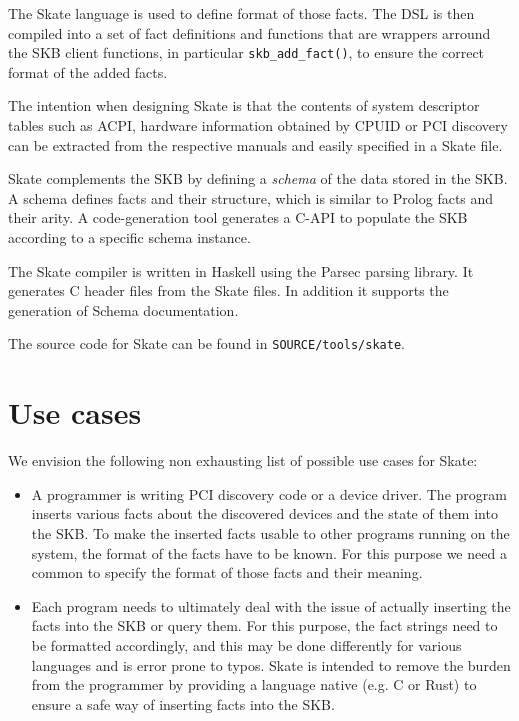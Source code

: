 \documentclass[a4paper,11pt,twoside]{report}
\begin{document}
{{The Skate language is used to define format of those facts. The DSL is then 
compiled into a set of fact definitions and functions that are wrappers arround
the SKB client functions, in particular \texttt{skb\_add\_fact()}, to ensure
the correct format of the added facts.  

The intention when designing Skate is that the contents of system descriptor
tables such as ACPI, hardware information obtained by CPUID or PCI discovery
can be extracted from the respective manuals and easily specified in a Skate 
file. 

Skate complements the SKB by defining a \emph{schema} of the data stored in
the SKB. A schema defines facts and their structure, which is similar to Prolog
facts and their arity. A code-generation tool generates a C-API to populate the
SKB according to a specific schema instance.

The Skate compiler is written in Haskell using the Parsec parsing library. It
generates C header files from the Skate files. In addition it supports the 
generation of Schema documentation.

The source code for Skate can be found in \texttt{SOURCE/tools/skate}.


\section{Use cases}

We envision the following non exhausting list of possible use cases for Skate:

\begin{itemize}
    \item A programmer is writing PCI discovery code or a device driver. The
    program inserts various facts about the discovered devices and the state
    of them into the SKB. To make the inserted facts usable to other programs
    running on the system, the format of the facts have to be known. For this 
    purpose we need a common to specify the format of those facts and their 
    meaning.
    
    \item Each program needs to ultimately deal with the issue of actually 
    inserting the facts into the SKB or query them. For this purpose, the fact 
    strings need to be formatted accordingly, and this may be done differently 
    for various languages and is error prone to typos. Skate is intended to 
    remove the burden from the programmer by providing a language native (e.g. 
    C or Rust) to ensure a safe way of inserting facts into the SKB. 
    

\end{itemize}}}
\end{document}
